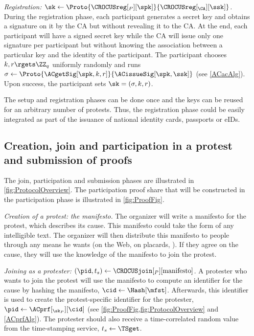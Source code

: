 \emph{Registration: \(\sk\gets 
    \Proto{\CROCUSreg[_P][\spk]}{\CROCUSreg[_{\CA}][\ssk]}\).}
During the registration phase, each participant generates a secret key and 
obtains a signature on it by the \ac{CA} but without revealing it to the 
\ac{CA}.
At the end, each participant will have a signed secret key while the \ac{CA} 
will issue only one signature per participant but without knowing the 
association between a particular key and the identity of the participant.
The participant chooses \(k, r\rgets \ZZ_q\) uniformly randomly and runs 
\(\sigma \gets \Proto{\ACgetSig[\spk, k, r]}{\ACissueSig[\spk, \ssk]}\) (see 
\cref{ACacAlg}).
Upon success, the participant sets \(\sk = (\sigma, k, r)\).

The setup and registration phases can be done once and the keys can be reused 
for an arbitrary number of protests.
Thus, the registration phase could be easily integrated as part of the issuance 
of national identity cards, passports or \acp{eID}.

\subsection{Creation, join and participation in a protest and submission of proofs}%
\label{ProtocolDuring}

The join, participation and submission phases are illustrated in \cref{fig:ProtocolOverview}.
The participation proof share that will be constructed in the participation phase is illustrated in \cref{fig:ProofFig}.

\emph{Creation of a protest: the manifesto.}
The organizer will write a manifesto for the protest, which describes its cause.
This manifesto could take the form of any intelligible text.
The organizer will then distribute this manifesto to people through any means he wants (\eg on the Web, on placards, \etc).
If they agree on the cause, they will use the knowledge of the manifesto to join the protest.


\emph{Joining as a protester: \((\pid, t_s)\gets 
    \CROCUSjoin[_P][\text{manifesto}]\).}
A protester who wants to join the protest will use the manifesto to compute an identifier for the cause by hashing the manifesto, \(\cid\gets \Hash[\mfst]\).
Afterwards, this identifier is used to create the protest-specific identifier 
for the protester, \(\pid\gets \ACprf[_{\sk_P}][\cid]\) (see 
\cref{fig:ProofFig,fig:ProtocolOverview} and \cref{ACprfAlg}).
The protester should also receive a time-correlated random value from the 
time-stamping service, \(t_s\gets \TSget\).


